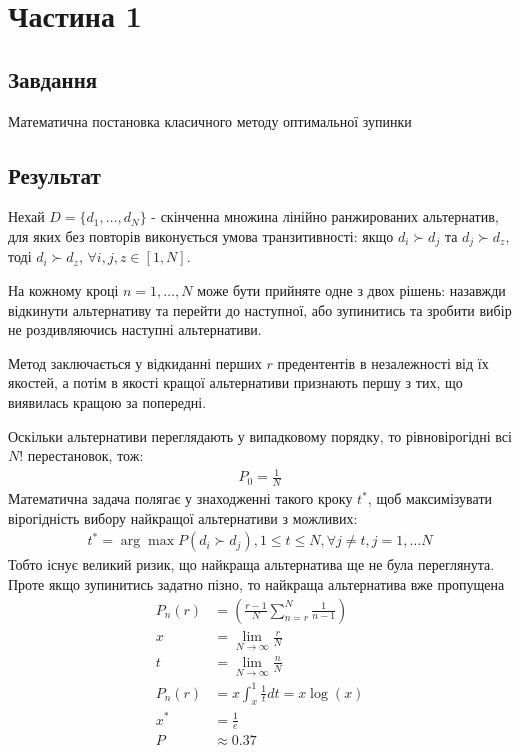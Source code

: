 \section{Частина 1}
\label{sec:task1}

\subsection{Завдання}
\label{subsec:task1_task}

Математична постановка класичного методу оптимальної зупинки

\subsection{Результат}
\label{subsec:task1_result}

Нехай $D = \{d_1, \dots, d_N\}$ - скінченна множина
лінійно ранжированих альтернатив, для яких без повторів
виконується умова транзитивності:
якщо $d_i \succ d_j$ та $d_j \succ d_z$,
тоді $d_i \succ d_z$, $\forall i, j, z \in [1, N]$.

На кожному кроці $n = 1, \dots, N$ може бути прийняте
одне з двох рішень: назавжди відкинути альтернативу
та перейти до наступної, або зупинитись та зробити
вибір не роздивляючись наступні альтернативи.

Метод заключається у відкиданні перших $r$ предентентів
в незалежності від їх якостей, а потім в якості кращої
альтернативи признають першу з тих, що виявилась кращою
за попередні.

Оскільки альтернативи переглядають у випадковому порядку,
то рівновірогідні всі $N!$ перестановок, тож:
\begin{align}
    P_0 = \frac{1}{N}
\end{align}
Математична задача полягає у знаходженні такого кроку $t^*$,
щоб максимізувати вірогідність вибору найкращої альтернативи
з можливих:
\begin{align}
    t^* = \arg \max P(d_i \succ d_j),
    1 \leq t \leq N,
    \forall j \neq t,
    j = 1, \dots N
\end{align}
Тобто існує великий ризик, що найкраща альтернатива
ще не була переглянута. Проте якщо зупинитись задатно
пізно, то найкраща альтернатива вже пропущена
\begin{align}
    P_n(r) & = (\frac{r - 1}{N} \sum_{n = r}^N \frac{1}{n - 1}) \\
    x      & = \lim_{N \to \infty} \frac{r}{N}                  \\
    t      & = \lim_{N \to \infty} \frac{n}{N}                  \\
    P_n(r) & = x \int_{x}^{1} \frac{1}{t} dt = x \log (x)       \\
    x^*    & = \frac{1}{e}                                      \\
    P      & \approx 0.37
\end{align}
